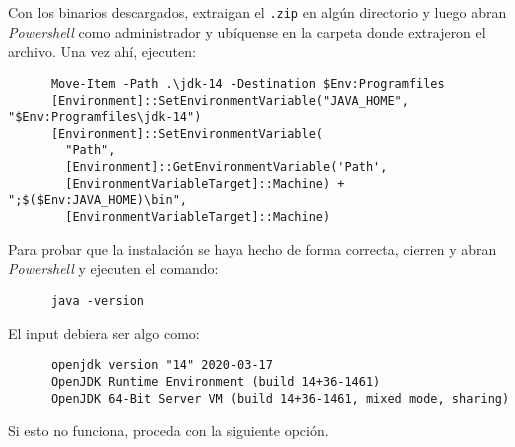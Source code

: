     Con los binarios descargados, extraigan el \texttt{.zip} en algún directorio y luego 
    abran \textit{Powershell} como administrador y ubíquense en la carpeta donde 
    extrajeron el archivo.
    Una vez ahí, ejecuten:

    \begin{verbatim}
      Move-Item -Path .\jdk-14 -Destination $Env:Programfiles
      [Environment]::SetEnvironmentVariable("JAVA_HOME", "$Env:Programfiles\jdk-14")
      [Environment]::SetEnvironmentVariable(
        "Path", 
        [Environment]::GetEnvironmentVariable('Path', 
        [EnvironmentVariableTarget]::Machine) + ";$($Env:JAVA_HOME)\bin", 
        [EnvironmentVariableTarget]::Machine)
    \end{verbatim}

    Para probar que la instalación se haya hecho de forma correcta, cierren y abran 
    \textit{Powershell} y ejecuten el comando:

    \begin{verbatim}
      java -version
    \end{verbatim}

    El input debiera ser algo como:

    \begin{verbatim}
      openjdk version "14" 2020-03-17
      OpenJDK Runtime Environment (build 14+36-1461)
      OpenJDK 64-Bit Server VM (build 14+36-1461, mixed mode, sharing)
    \end{verbatim}

    Si esto no funciona, proceda con la siguiente opción.
%